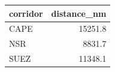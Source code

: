 \begin{tabular}{lr}
\toprule
corridor &  distance\_nm \\
\midrule
    CAPE &      15251.8 \\
     NSR &       8831.7 \\
    SUEZ &      11348.1 \\
\bottomrule
\end{tabular}
